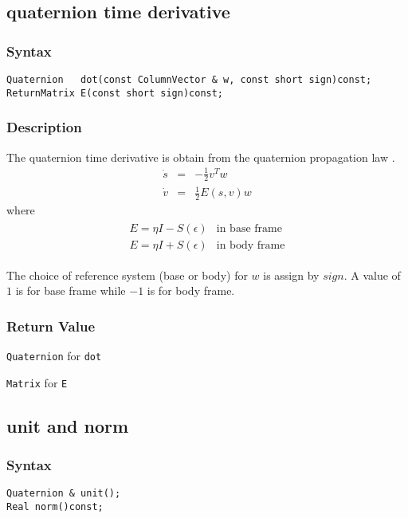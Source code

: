 \documentclass[dvips,11pt,fleqn]{report}
\newcommand{\mbold}[1]{\mbox{\boldmath $ #1 $}}
\begin{document}
\subsection*{quaternion time derivative}

\subsubsection*{Syntax}
\begin{verbatim}
Quaternion   dot(const ColumnVector & w, const short sign)const;
ReturnMatrix E(const short sign)const; 
\end{verbatim}
\subsubsection{Description}
The quaternion time derivative is obtain from the quaternion
propagation law \cite{Dam98}.
\begin{eqnarray}
 \dot{s} &=& -\frac{1}{2}v^Tw \\
 \dot{v} &=& \frac{1}{2}E(s,v)w 
\end{eqnarray}
where
\begin{eqnarray}
 \begin{array}{cc}
   E = \eta I - S(\epsilon) & \textrm{in base frame} \\
   E = \eta I + S(\epsilon) & \textrm{in body frame}
  \end{array}
\end{eqnarray}

\noindent
The choice of reference system (base or body) for \mbold{w} is assign
by \mbold{sign}. A value of $1$ is for base frame while $-1$ is for
body frame.

\subsubsection*{Return Value}

{\tt Quaternion} for \texttt{dot}

\noindent \texttt{Matrix} for \texttt{E}

\newpage

\subsection*{unit and norm}

\subsubsection*{Syntax}
\begin{verbatim}
Quaternion & unit();
Real norm()const;
\end{verbatim}
\end{document}
